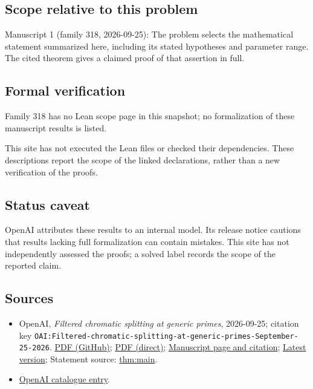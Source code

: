 \documentclass[11pt]{article}
\begin{document}
\subsection{Scope relative to this problem}
Manuscript 1 (family 318, 2026-09-25): The problem selects the mathematical statement summarized here, including its stated hypotheses and parameter range. The cited theorem gives a claimed proof of that assertion in full.

\subsection{Formal verification}
Family 318 has no Lean scope page in this snapshot; no formalization of these manuscript results is listed.

This site has not executed the Lean files or checked their dependencies. These descriptions report the scope of the linked declarations, rather than a new verification of the proofs.

\subsection{Status caveat}
OpenAI attributes these results to an internal model. Its release notice cautions that results lacking full formalization can contain mistakes. This site has not independently assessed the proofs; a solved label records the scope of the reported claim.

\subsection{Sources}
\begin{itemize}
\item OpenAI, \emph{Filtered chromatic splitting at generic primes}, 2026-09-25; citation key \texttt{OAI:Filtered-chromatic-splitting-at-generic-primes-September-25-2026}. \href{https://github.com/openai/math/blob/adc7f1241b42e322a6451854ab7e4b4c146bf78a/preprints/Filtered-chromatic-splitting-at-generic-primes-September-25-2026/paper.pdf}{PDF (GitHub)}; \href{https://github.com/openai/math/raw/adc7f1241b42e322a6451854ab7e4b4c146bf78a/preprints/Filtered-chromatic-splitting-at-generic-primes-September-25-2026/paper.pdf}{PDF (direct)}; \href{https://github.com/openai/math/blob/adc7f1241b42e322a6451854ab7e4b4c146bf78a/preprints/Filtered-chromatic-splitting-at-generic-primes-September-25-2026/README.md}{Manuscript page and citation}; \href{https://github.com/openai/math/blob/main/preprints/Filtered-chromatic-splitting-at-generic-primes-September-25-2026/paper.pdf}{Latest version}; Statement source: \href{https://github.com/openai/math/blob/adc7f1241b42e322a6451854ab7e4b4c146bf78a/preprints/Filtered-chromatic-splitting-at-generic-primes-September-25-2026/build/sections/01-introduction.tex\#L33}{thm:main}.
\item \href{https://github.com/openai/math/blob/adc7f1241b42e322a6451854ab7e4b4c146bf78a/CONTENTS.md}{OpenAI catalogue entry}.
\end{itemize}
\end{document}
